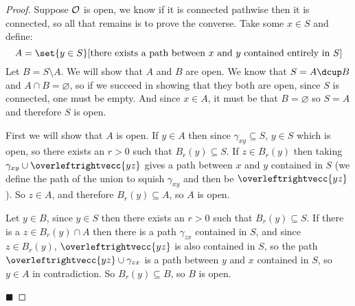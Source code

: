 \documentclass[10pt]{article}
\def\openset{{\cal O}}
\let\lineseg=\overleftrightvecc
\begin{document}
\begin{proof}

    Suppose $\openset$ is open, we know if it is connected pathwise then it is connected, so all that remains is to prove the converse.
    Take some $x\in S$ and define:
        \[ A = \set{y\in S}[\text{there exists a path between $x$ and $y$ contained entirely in $S$}] \]
    Let $B=S\setminus A$.
    We will show that $A$ and $B$ are open.
    We know that $S=A\dcup B$ and $A\cap B=\varnothing$, so if we succeed in showing that they both are open, since $S$ is connected, one must be empty.
    And since $x\in A$, it must be that $B=\varnothing$ so $S=A$ and therefore $S$ is open.

    First we will show that $A$ is open.
    If $y\in A$ then since $\gamma_{xy}\subseteq S$, $y\in S$ which is open, so there exists an $r>0$ such that $B_r(y)\subseteq S$.
    If $z\in B_r(y)$ then taking $\gamma_{xy}\cup\lineseg{yz}$ gives a path between $x$ and $y$ contained in $S$ (we define the path of the union to squish $\gamma_{xy}$ and then be $\lineseg{yz}$).
    So $z\in A$, and therefore $B_r(y)\subseteq A$, so $A$ is open.

    Let $y\in B$, since $y\in S$ then there exists an $r>0$ such that $B_r(y)\subseteq S$.
    If there is a $z\in B_r(y)\cap A$ then there is a path $\gamma_{zx}$ contained in $S$, and since $z\in B_r(y)$, $\lineseg{yz}$ is also contained in $S$, so the path $\lineseg{yz}\cup\gamma_{zx}$
    is a path between $y$ and $x$ contained in $S$, so $y\in A$ in contradiction.
    So $B_r(y)\subseteq B$, so $B$ is open.

    \hfill$\blacksquare$

\end{proof}
\end{document}
